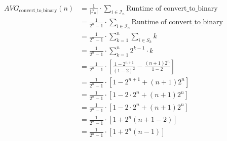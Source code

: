 \documentclass[12pt]{article}
\begin{document}
\begin{enumerate}[a.]
\begin{mdframed}
\begin{enumerate}[1.]
        \begin{mdframed}
            \begin{align}
                AVG_{\text{convert\_to\_binary}}(n) &= \frac{1}{\lvert \mathcal{I}_n \rvert} \cdot \sum\limits_{i \in \mathcal{I}_n} \text{Runtime of convert\_to\_binary}\\
                &= \frac{1}{2^n - 1} \cdot \sum\limits_{i \in \mathcal{I}_n} \text{Runtime of convert\_to\_binary}\\
                &= \frac{1}{2^n - 1} \cdot \sum\limits_{k = 1}^n \sum\limits_{i \in S_k} k\\
                &= \frac{1}{2^n - 1} \cdot \sum\limits_{k = 1}^n 2^{k-1} \cdot k\\
                &= \frac{1}{2^n - 1} \cdot \left[ \frac{1 - 2^{n+1}}{(1-2)^2} - \frac{(n+1)2^n}{1-2} \right]\\
                &= \frac{1}{2^n - 1} \cdot \left[ 1 - 2^{n+1} + (n+1)2^n \right]\\
                &= \frac{1}{2^n - 1} \cdot \left[ 1 - 2 \cdot 2^n + (n+1)2^n \right]\\
                &= \frac{1}{2^n - 1} \cdot \left[ 1 - 2 \cdot 2^n + (n+1)2^n \right]\\
                &= \frac{1}{2^n - 1} \cdot \left[ 1 + 2^n(n+1 - 2) \right]\\
                &= \frac{1}{2^n - 1} \cdot \left[ 1 + 2^n(n-1) \right]
            \end{align}
        \end{mdframed}
    \end{enumerate}

    \end{mdframed}

\end{enumerate}
\end{document}
